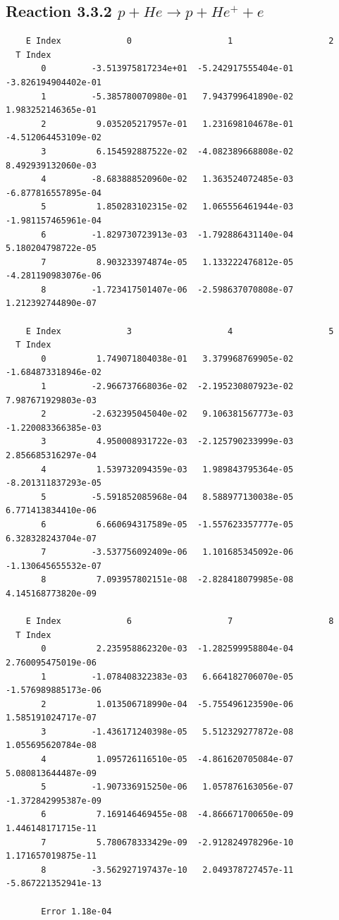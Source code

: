 \documentclass[12pt,dvipdfmx]{article}
\begin{document}
\newpage
\subsection{
Reaction 3.3.2 $   p + He \rightarrow p + He^+ + e$}

\begin{small}\begin{verbatim}
    E Index             0                   1                   2
  T Index
       0         -3.513975817234e+01  -5.242917555404e-01  -3.826194904402e-01
       1         -5.385780070980e-01   7.943799641890e-02   1.983252146365e-01
       2          9.035205217957e-01   1.231698104678e-01  -4.512064453109e-02
       3          6.154592887522e-02  -4.082389668808e-02   8.492939132060e-03
       4         -8.683888520960e-02   1.363524072485e-03  -6.877816557895e-04
       5          1.850283102315e-02   1.065556461944e-03  -1.981157465961e-04
       6         -1.829730723913e-03  -1.792886431140e-04   5.180204798722e-05
       7          8.903233974874e-05   1.133222476812e-05  -4.281190983076e-06
       8         -1.723417501407e-06  -2.598637070808e-07   1.212392744890e-07

    E Index             3                   4                   5
  T Index
       0          1.749071804038e-01   3.379968769905e-02  -1.684873318946e-02
       1         -2.966737668036e-02  -2.195230807923e-02   7.987671929803e-03
       2         -2.632395045040e-02   9.106381567773e-03  -1.220083366385e-03
       3          4.950008931722e-03  -2.125790233999e-03   2.856685316297e-04
       4          1.539732094359e-03   1.989843795364e-05  -8.201311837293e-05
       5         -5.591852085968e-04   8.588977130038e-05   6.771413834410e-06
       6          6.660694317589e-05  -1.557623357777e-05   6.328328243704e-07
       7         -3.537756092409e-06   1.101685345092e-06  -1.130645655532e-07
       8          7.093957802151e-08  -2.828418079985e-08   4.145168773820e-09

    E Index             6                   7                   8
  T Index
       0          2.235958862320e-03  -1.282599958804e-04   2.760095475019e-06
       1         -1.078408322383e-03   6.664182706070e-05  -1.576989885173e-06
       2          1.013506718990e-04  -5.755496123590e-06   1.585191024717e-07
       3         -1.436171240398e-05   5.512329277872e-08   1.055695620784e-08
       4          1.095726116510e-05  -4.861620705084e-07   5.080813644487e-09
       5         -1.907336915250e-06   1.057876163056e-07  -1.372842995387e-09
       6          7.169146469455e-08  -4.866671700650e-09   1.446148171715e-11
       7          5.780678333429e-09  -2.912824978296e-10   1.171657019875e-11
       8         -3.562927197437e-10   2.049378727457e-11  -5.867221352941e-13

       Error 1.18e-04
\end{verbatim}\end{small}
\end{document}
